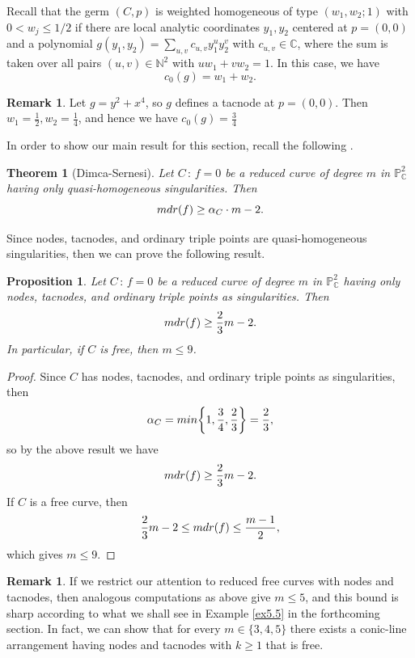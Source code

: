 \documentclass[12pt]{amsart}
\theoremstyle{plain}
\newtheorem{thm}[subsection]{Theorem}
\newtheorem{prop}[subsection]{Proposition}
\theoremstyle{definition}
\newtheorem{rk}[subsection]{Remark}
\numberwithin{equation}{section}
\begin{document}
Recall that the germ $(C,p)$ is weighted homogeneous of type $(w_{1},w_{2};1)$ with $0 < w_{j} \leq 1/2$ if there are local analytic coordinates $y_{1}, y_{2}$ centered at $p=(0,0)$ and a polynomial $g(y_{1},y_{2})= \sum_{u,v} c_{u,v} y_{1}^{u} y_{2}^{v}$ with $c_{u,v} \in \mathbb{C}$, where the sum is taken over all pairs $(u,v) \in \mathbb{N}^{2}$ with $u w_{1} + v w_{2}=1$. In this case, we have $$c_{0}(g) = w_{1}+w_{2}.$$
\begin{rk}
Let $g = y^{2} + x^{4}$, so $g$ defines a tacnode at $p=(0,0)$. Then $w_{1}=\frac{1}{2}, w_{2} = \frac{1}{4}$, and hence we have $c_{0}(g) = \frac{3}{4}$
\end{rk}
In order to show our main result for this section, recall the following \cite[Theorem 2.1]{DimcaSernesi}.
\begin{thm}[Dimca-Sernesi]
Let $C \, : \, f = 0$ be a reduced curve of degree $m$ in $\mathbb{P}^{2}_{\mathbb{C}}$ having only quasi-homogeneous singularities. Then $${\rm mdr}(f) \geq \alpha_{C}\cdot m -2.$$
\end{thm}
Since nodes, tacnodes, and ordinary triple points are quasi-homogeneous singularities, then we can prove the following result.
\begin{prop}
\label{prop:bound9}
Let $C \, : \, f=0$ be a reduced curve of degree $m$ in $\mathbb{P}^{2}_{\mathbb{C}}$ having only nodes, tacnodes, and ordinary triple points as singularities. Then
$${\rm mdr}(f) \geq \frac{2}{3}m-2.$$
In particular, if $C$ is free, then $m \leq 9$.
\end{prop}
\begin{proof}
Since $C$ has nodes, tacnodes, and ordinary triple points as singularities, then
$$\alpha_{C} = {\rm min} \bigg\{1, \frac{3}{4}, \frac{2}{3} \bigg\} = \frac{2}{3},$$
so by the above result we have
$${\rm mdr}(f) \geq \frac{2}{3}m - 2.$$ 
If $C$ is a free curve, then
$$\frac{2}{3}m - 2 \leq {\rm mdr}(f) \leq \frac{m-1}{2}, $$
which gives $m \leq 9$. 
\end{proof}
\begin{rk}
If we restrict our attention to reduced free curves with nodes and tacnodes, then analogous computations as above give $m \leq 5$, and this bound is sharp according to what we shall see in Example \ref{ex5.5} in the forthcoming section. In fact, we can show that for every $m \in \{3,4,5\}$ there exists a conic-line arrangement having nodes and tacnodes with $k\geq 1$ that is free.
\end{rk}
\end{document}
